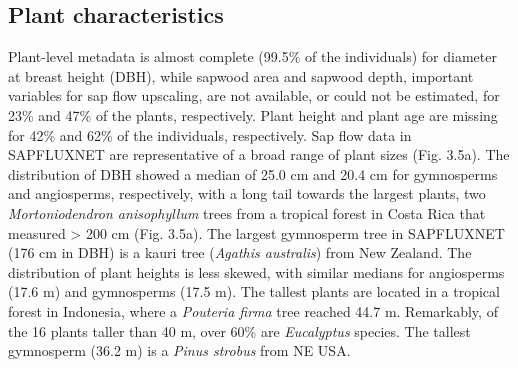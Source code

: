 \documentclass[11pt,twoside]{reedthesis}
\begin{document}
\subsection{Plant characteristics}\label{plant-characteristics}

Plant-level metadata is almost complete (99.5\% of the individuals) for
diameter at breast height (DBH), while sapwood area and sapwood depth,
important variables for sap flow upscaling, are not available, or could
not be estimated, for 23\% and 47\% of the plants, respectively. Plant
height and plant age are missing for 42\% and 62\% of the individuals,
respectively. Sap flow data in SAPFLUXNET are representative of a broad
range of plant sizes (Fig. 3.5a). The distribution of DBH showed a
median of 25.0 cm and 20.4 cm for gymnosperms and angiosperms,
respectively, with a long tail towards the largest plants, two
\emph{Mortoniodendron anisophyllum} trees from a tropical forest in
Costa Rica that measured \textgreater{} 200 cm (Fig. 3.5a). The largest
gymnosperm tree in SAPFLUXNET (176 cm in DBH) is a kauri tree
(\emph{Agathis australis}) from New Zealand. The distribution of plant
heights is less skewed, with similar medians for angiosperms (17.6 m)
and gymnosperms (17.5 m). The tallest plants are located in a tropical
forest in Indonesia, where a \emph{Pouteria firma} tree reached 44.7 m.
Remarkably, of the 16 plants taller than 40 m, over 60\% are
\emph{Eucalyptus} species. The tallest gymnosperm (36.2 m) is a
\emph{Pinus strobus} from NE USA.\par
\end{document}
